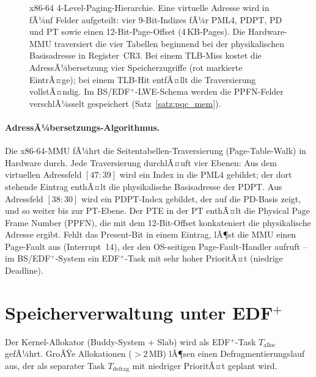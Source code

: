 ﻿\documentclass[a4paper,12pt]{scrreprt}
\theoremstyle{definition}
\begin{document}
\begin{figure}[H]
		\caption{x86-64 4-Level-Paging-Hierarchie. Eine virtuelle Adresse wird in
			fÃ¼nf Felder aufgeteilt: vier 9-Bit-Indizes fÃ¼r PML4, PDPT, PD und PT
			sowie einen 12-Bit-Page-Offset (4\,KB-Pages). Die Hardware-MMU traversiert
			die vier Tabellen beginnend bei der physikalischen Basisadresse in
			Register~CR3. Bei einem TLB-Miss kostet die AdressÃ¼bersetzung vier
			Speicherzugriffe (rot markierte EintrÃ¤ge); bei einem TLB-Hit entfÃ¤llt
			die Traversierung vollstÃ¤ndig. Im BS/EDF$^+$-LWE-Schema werden die
			PPFN-Felder verschlÃ¼sselt gespeichert (Satz~\ref{satz:pqc_mem}).}
		\label{fig:paging}
	\end{figure}

	\paragraph{AdressÃ¼bersetzungs-Algorithmus.}
	Die x86-64-MMU fÃ¼hrt die Seitentabellen-Traversie\-rung (Page-Table-Walk)
	in Hardware durch. Jede Traversierung durchlÃ¤uft vier Ebenen: Aus dem
	virtuellen Adressfeld $[47:39]$ wird ein Index in die PML4 gebildet;
	der dort stehende Eintrag enthÃ¤lt die physikalische Basisadresse der PDPT.
	Aus Adressfeld $[38:30]$ wird ein PDPT-Index gebildet, der auf die PD-Basis
	zeigt, und so weiter bis zur PT-Ebene. Der PTE in der PT enthÃ¤lt die
	Physical Page Frame Number (PPFN), die mit dem 12-Bit-Offset konkateniert
	die physikalische Adresse ergibt. Fehlt das Present-Bit in einem Eintrag,
	lÃ¶st die MMU einen Page-Fault aus (Interrupt~14), der den OS-seitigen
	Page-Fault-Handler aufruft -- im BS/EDF$^+$-System ein EDF$^+$-Task
	mit sehr hoher PrioritÃ¤t (niedrige Deadline).

	\section{Speicherverwaltung unter \texorpdfstring{EDF$^+$}{EDF+}}

	Der Kernel-Allokator (Buddy-System + Slab) wird als EDF$^+$-Task
	$T_{\mathrm{alloc}}$ gefÃ¼hrt. GroÃŸe Allokationen ($> 2\,\mathrm{MB}$)
	lÃ¶sen einen Defragmentierungslauf aus, der als separater Task
	$T_{\mathrm{defrag}}$ mit niedriger PrioritÃ¤t geplant wird.
\end{document}
